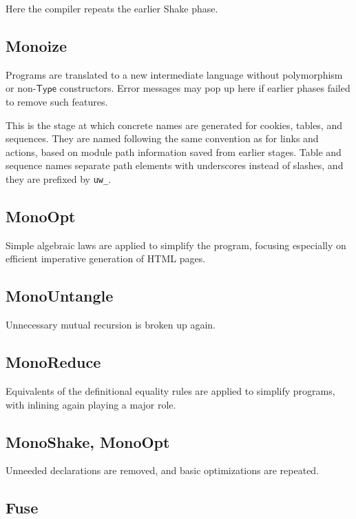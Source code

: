 \documentclass{article}
\newcommand{\mt}[1]{\mathsf{#1}}
\begin{document}
Here the compiler repeats the earlier Shake phase.

\subsection{Monoize}

Programs are translated to a new intermediate language without polymorphism or non-$\mt{Type}$ constructors.  Error messages may pop up here if earlier phases failed to remove such features.

This is the stage at which concrete names are generated for cookies, tables, and sequences.  They are named following the same convention as for links and actions, based on module path information saved from earlier stages.  Table and sequence names separate path elements with underscores instead of slashes, and they are prefixed by \texttt{uw\_}.

\subsection{MonoOpt}

Simple algebraic laws are applied to simplify the program, focusing especially on efficient imperative generation of HTML pages.

\subsection{MonoUntangle}

Unnecessary mutual recursion is broken up again.

\subsection{MonoReduce}

Equivalents of the definitional equality rules are applied to simplify programs, with inlining again playing a major role.

\subsection{MonoShake, MonoOpt}

Unneeded declarations are removed, and basic optimizations are repeated.

\subsection{Fuse}
\end{document}
